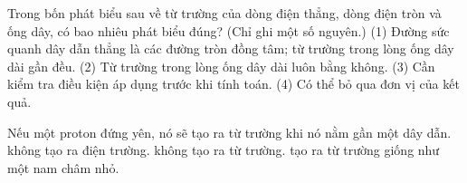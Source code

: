 \begin{ex}
Trong bốn phát biểu sau về từ trường của dòng điện thẳng, dòng điện tròn và ống dây, có bao nhiêu phát biểu đúng? (Chỉ ghi một số nguyên.) (1) Đường sức quanh dây dẫn thẳng là các đường tròn đồng tâm; từ trường trong lòng ống dây dài gần đều. (2) Từ trường trong lòng ống dây dài luôn bằng không. (3) Cần kiểm tra điều kiện áp dụng trước khi tính toán. (4) Có thể bỏ qua đơn vị của kết quả.
\end{ex}

\begin{ex}
Nếu một proton đứng yên, nó sẽ
\choice
{tạo ra từ trường khi nó nằm gần một dây dẫn.}
{không tạo ra điện trường.}
{\True không tạo ra từ trường.}
{tạo ra từ trường giống như một nam châm nhỏ.}
\end{ex}

